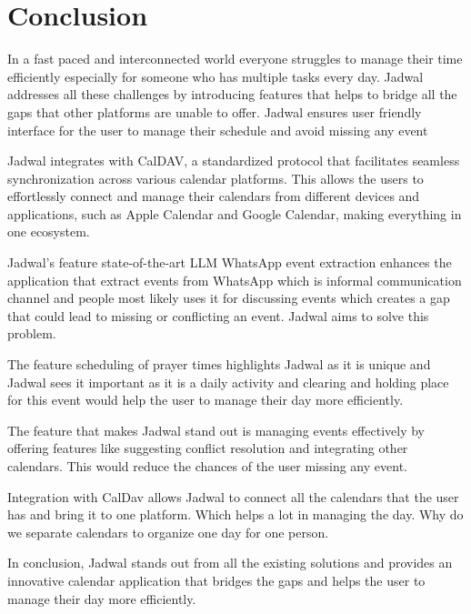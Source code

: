 \documentclass[12pt,a4paper,twoside]{report}
\begin{document}
\chapter*{Conclusion}

In a fast paced and interconnected world everyone struggles to manage their time efficiently especially for someone who has multiple tasks every day. Jadwal addresses all these challenges by introducing features that helps to bridge all the gaps that other platforms are unable to offer. Jadwal ensures user friendly interface for the user to manage their schedule and avoid missing any event

Jadwal integrates with CalDAV, a standardized protocol that facilitates seamless synchronization across various calendar platforms. This allows the users to effortlessly connect and manage their calendars from different devices and applications, such as Apple Calendar and Google Calendar, making everything in one ecosystem.

Jadwal's feature state-of-the-art LLM WhatsApp event extraction enhances the application that extract events from WhatsApp which is informal communication channel and people most likely uses it for discussing events which creates a gap that could lead to missing or conflicting an event. Jadwal aims to solve this problem.

The feature scheduling of prayer times highlights Jadwal as it is unique and Jadwal sees it important as it is a daily activity and clearing and holding place for this event would help the user to manage their day more efficiently.

The feature that makes Jadwal stand out is managing events effectively by offering features like suggesting conflict resolution and integrating other calendars. This would reduce the chances of the user missing any event.

Integration with CalDav allows Jadwal to connect all the calendars that the user has and bring it to one platform. Which helps a lot in managing the day. Why do we separate calendars to organize one day for one person.

In conclusion, Jadwal stands out from all the existing solutions and provides an innovative calendar application that bridges the gaps and helps the user to manage their day more efficiently.




\end{document}
